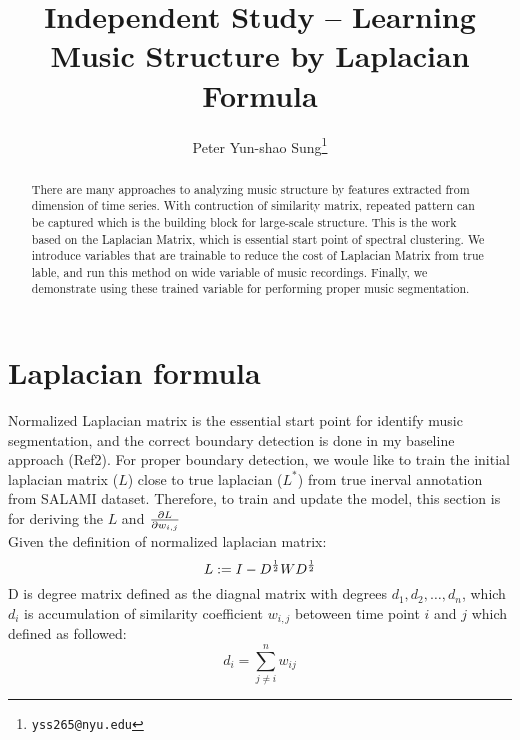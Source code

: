 \documentclass[final]{siamltexmm}
\title{Independent Study -- Learning Music Structure by Laplacian Formula}
\author{Peter Yun-shao Sung\thanks{\tt yss265@nyu.edu} }
\begin{document}
\maketitle

\begin{abstract}
There are many approaches to analyzing music structure by features extracted from dimension of time series. With contruction of similarity matrix, repeated pattern can be captured which is the building block for large-scale structure. This is the work based on the Laplacian Matrix, which is essential start point of spectral clustering. We introduce variables that are trainable to reduce the cost of Laplacian Matrix from true lable, and run this method on wide variable of music recordings. Finally, we demonstrate using these trained variable for performing proper music segmentation.
\end{abstract}

\pagestyle{myheadings}
\thispagestyle{plain}

\section{Laplacian formula}
Normalized Laplacian matrix is the essential start point for identify music segmentation, and the correct boundary detection is done in my baseline approach (Ref2). For proper boundary detection, we woule like to train the initial laplacian matrix ($L$) close to true laplacian ($L^{\ast}$) from true inerval annotation from SALAMI dataset. Therefore, to train and update the model, this section is for deriving the $L$ and ${\partial L \over \partial w_{i,j}}$\\
Given the definition of normalized laplacian matrix:
\begin{equation}
L := I - D^{1 \over 2}W D^{1 \over 2}
\end{equation}
D is degree matrix defined as the diagnal matrix with degrees $d_1, d_2, \ldots, d_n$, which $d_i$ is accumulation of similarity coefficient $w_{i,j}$ betoween time point $i$ and $j$ which defined as followed:
\begin{equation}
d_i = \displaystyle\sum_{j \neq i}^{n} w_{ij}
\end{equation}
\end{document}
